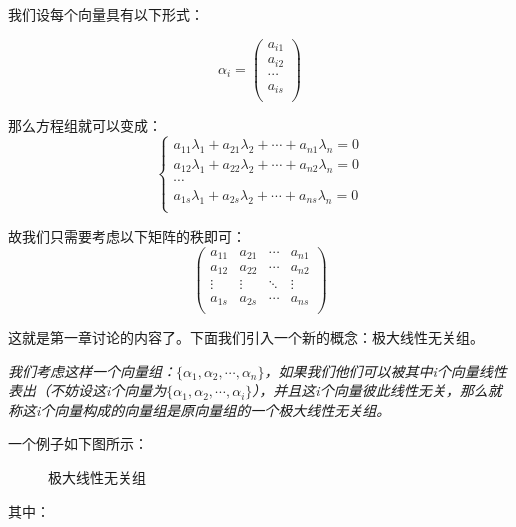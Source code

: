\documentclass[a4paper]{ctexart}
\begin{document}
我们设每个向量具有以下形式：

$$
\alpha_i=
\left(
\begin{array}{cccc}
a_{i1}\\
a_{i2}\\
\cdots \\
a_{is}\\
\end{array}
\right )
$$

那么方程组就可以变成：
$$
\begin{cases}
a_{11}\lambda_{1}+a_{21}\lambda_{2}+\cdots+a_{n1}\lambda_{n}=0\\
a_{12}\lambda_{1}+a_{22}\lambda_{2}+\cdots+a_{n2}\lambda_{n}=0\\
\cdots\\
a_{1s}\lambda_{1}+a_{2s}\lambda_{2}+\cdots+a_{ns}\lambda_{n}=0\\
\end{cases}
$$

故我们只需要考虑以下矩阵的秩即可：
$$
\begin{pmatrix}
a_{11}&a_{21}&\cdots&a_{n1}\\
a_{12}&a_{22}&\cdots&a_{n2}\\
\vdots&\vdots&\ddots&\vdots\\
a_{1s}&a_{2s}&\cdots&a_{ns}\\
\end{pmatrix}
$$

这就是第一章讨论的内容了。下面我们引入一个新的概念：极大线性无关组。

\textit{我们考虑这样一个向量组：$\{\alpha_1,\alpha_2,\cdots,\alpha_n\}$，如果我们他们可以被其中i个向量线性表出（不妨设这i个向量为$\{\alpha_1,\alpha_2,\cdots,\alpha_i\}$），并且这i个向量彼此线性无关，那么就称这i个向量构成的向量组是原向量组的一个极大线性无关组。}

一个例子如下图所示：

\begin{figure}[htp]
  \centering
  \caption{极大线性无关组}
\end{figure}

其中：
\end{document}
